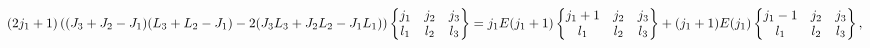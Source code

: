 \[{(2j_{1}+1)\left((J_{3}+J_{2}-J_{1})(L_{3}+L_{2}-J_{1})-2(J_{3}L_{3}+J_{2}L_{2%
}-J_{1}L_{1})\right)\begin{Bmatrix}j_{1}&j_{2}&j_{3}\\
l_{1}&l_{2}&l_{3}\end{Bmatrix}}\\
=j_{1}E(j_{1}+1)\begin{Bmatrix}j_{1}+1&j_{2}&j_{3}\\
l_{1}&l_{2}&l_{3}\end{Bmatrix}+(j_{1}+1)E(j_{1})\begin{Bmatrix}j_{1}-1&j_{2}&j%
_{3}\\
l_{1}&l_{2}&l_{3}\end{Bmatrix},\]